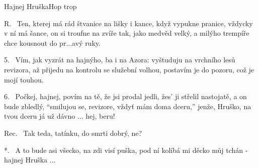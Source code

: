 \begin{song}{Hajnej Hruška}{Hop trop}
\begin{xverse}{R.~}
Ten, kterej má rád štvanice na lišky i kance,
když vypukne pranice, vždycky v ní má šance,
on si troufne na zvíře tak, jako medvěd velký,
a milýho trempíře chce kousnout do pr...avý ruky.
\end{xverse}

\begin{xverse}{5.~}
Vím, jak vyzrát na hajnýho, ba i na Azora:
vyštuduju na vrchního lesů revizora,
až přijedu na kontrolu se služební volhou,
postavím je do pozoru, což je mojí touhou.
\end{xverse}

\begin{xverse}{6.~}
Počkej, hajnej, povím na tě, že jsi prodal jedli,
žes' ji střelil nastojatě, a on bude zbledlý,
``smilujou se, revizore, vždyť mám doma dceru,''
jenže, Hruško, na tvou dceru já už dávno ... hej, beru!
\end{xverse}

\begin{xverse}{Rec.~}
Tak teda, tatínku, do smrti dobrý, ne?
\end{xverse}

\begin{xverse}{*.~}
A to bude asi všecko, na zdi visí puška,
pod ní kolíbá mi děcko můj tchán - hajnej Hruška ...
\end{xverse}

\end{song}

